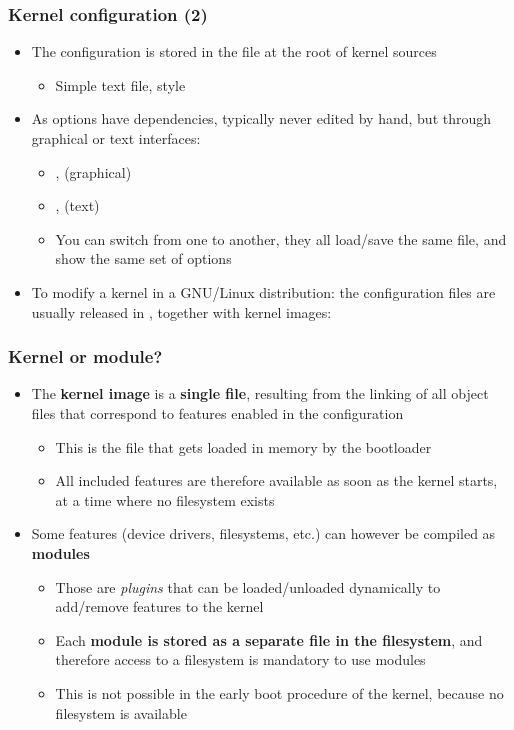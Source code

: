 \begin{frame}
  \frametitle{Kernel configuration (2)}
  \begin{itemize}
  \item The configuration is stored in the  file at the
    root of kernel sources
    \begin{itemize}
    \item Simple text file,  style
    \end{itemize}
  \item As options have dependencies, typically never edited by hand,
    but through graphical or text interfaces:
    \begin{itemize}
    \item {},  (graphical)
    \item {},  (text)
    \item You can switch from one to another, they all load/save the
      same  file, and show the same set of options
    \end{itemize}
  \item To modify a kernel in a GNU/Linux distribution: the
    configuration files are usually released in ,
    together with kernel images: 
  \end{itemize}
\end{frame}

\begin{frame}
  \frametitle{Kernel or module?}
  \begin{itemize}
  \item The {\bf kernel image} is a {\bf single file}, resulting from
    the linking of all object files that correspond to features
    enabled in the configuration
    \begin{itemize}
    \item This is the file that gets loaded in memory by the
      bootloader
    \item All included features are therefore available as soon as the
      kernel starts, at a time where no filesystem exists
    \end{itemize}
  \item Some features (device drivers, filesystems, etc.) can however
    be compiled as {\bf modules}
    \begin{itemize}
    \item Those are {\em plugins} that can be loaded/unloaded dynamically to
      add/remove features to the kernel
    \item Each {\bf module is stored as a separate file in the
        filesystem}, and therefore access to a filesystem is mandatory
      to use modules
    \item This is not possible in the early boot procedure of the
      kernel, because no filesystem is available
    \end{itemize}
  \end{itemize}
\end{frame}

